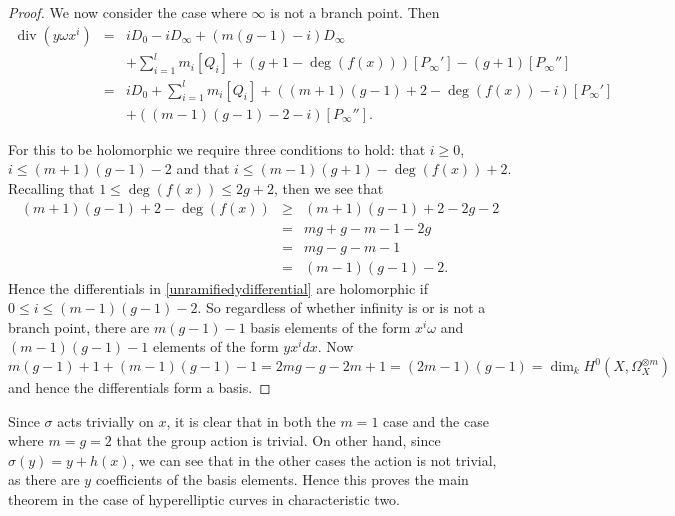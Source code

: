 \documentclass[11pt]{article} %
\theoremstyle{plain}
\theoremstyle{remark}
\DeclareMathOperator{\di}{div}
\begin{document}
\begin{proof}
 
 We now consider the case where $\infty$ is not a branch point.
 Then 
 \begin{eqnarray*}
  \di(y\omega x^i) & = & iD_0 -iD_\infty + (m(g-1)-i)D_\infty \\ & & 
  +\sum_{i=1}^l m_i[Q_i] +(g+1-\deg(f(x)))[P_\infty'] -(g+1)[P_\infty''] \\
 & = & iD_0 + \sum_{i=1}^l m_i[Q_i] + ((m+1)(g-1) + 2 - \deg(f(x)) -i)[P_\infty']\\
 & & +((m-1)(g-1)-2-i)[P_\infty''].
 \end{eqnarray*}
 
For this to be holomorphic we require three conditions to hold: that $i\geq 0$, $i\leq (m+1)(g-1)-2$ and that $i \leq (m-1)(g+1) - \deg(f(x)) + 2$.
Recalling that $1 \leq \deg(f(x)) \leq 2g+2$, then we see that 
\begin{eqnarray*}
 (m+1)(g-1)+2 - \deg(f(x)) & \geq & (m+1)(g-1) + 2 - 2g-2 \\
 & = & mg + g - m - 1 - 2g \\
 & = & mg - g -m -1 \\
 &= & (m-1)(g-1) - 2.
\end{eqnarray*}
Hence the differentials in \eqref{unramifiedydifferential} are holomorphic if $0 \leq i \leq (m-1)(g-1)-2$.
So regardless of whether infinity is or is not a branch point, there are $m(g-1)-1$ basis elements of the form $x^i\omega$ and $(m-1)(g-1)-1$ elements of the form $yx^idx$.
Now $$m(g-1)+1 + (m-1)(g-1) -1 = 2mg -g-2m+1 = (2m-1)(g-1) = \dim_kH^0(X,\Omega_X^{\otimes m})$$ and hence the differentials form a basis.
\end{proof}

  Since $\sigma$ acts trivially on $x$, it is clear that in both the $m=1$ case and the case where $m=g=2$ that the group action is trivial.
  On other hand, since $\sigma(y) = y+h(x)$, we can see that in the other cases the action is not trivial, as there are $y$ coefficients of the basis elements.
  Hence this proves the main theorem in the case of hyperelliptic curves in characteristic two.



%

\end{document}
